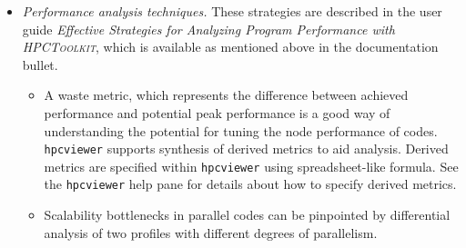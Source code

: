 \documentclass[10pt]{article}
\newcommand{\HPCToolkit}{\textsc{HPCToolkit}}
\begin{document}
\begin{itemize}
\item{ \em Performance analysis techniques.}
These strategies are described in the user guide {\em Effective Strategies for Analyzing Program Performance with \HPCToolkit{}}, which is available as mentioned above in the documentation bullet.
\begin{itemize}
\item
A waste metric, which represents the difference between achieved performance and potential peak performance is a good way of understanding the potential for tuning the node performance of codes. {\tt hpcviewer} supports synthesis of derived metrics to aid analysis. Derived metrics are specified within {\tt hpcviewer} using spreadsheet-like formula. See the {\tt hpcviewer} help pane for details about how to specify derived metrics.
\item
Scalability bottlenecks in parallel codes can be pinpointed by differential analysis of two profiles with different degrees of parallelism. 
\end{itemize}
\end{itemize}



\clearpage


\vspace{-18pt}

\end{document}
